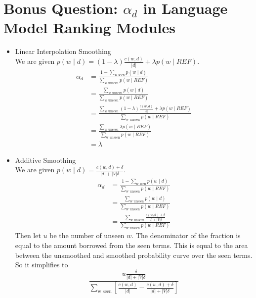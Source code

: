 \documentclass[paper=a4, fontsize=11pt]{jhwhw} %
\begin{document}
\section*{Bonus Question: $\alpha_d$ in Language Model Ranking Modules}
\solution
\begin{itemize}
    \item Linear Interpolation Smoothing\\
        We are given $p(w\mid d) = (1-\lambda)\frac{c(w,d)}{\lvert d\rvert} + \lambda p(w\mid REF)$.
        \begin{align*}
            \alpha_d &= \frac{1 - \sum_{\text{w seen}} p(w\mid d)}{\sum_{\text{w unseen}} p(w\mid REF)}\\
                     &= \frac{\sum_{\text{w unseen}} p(w\mid d)}{\sum_{\text{w unseen}} p(w\mid REF)}\\
                     &= \frac{\sum_{\text{w unseen}} (1-\lambda)\frac{c(w,d)}{\lvert d\rvert} + \lambda p(w\mid REF)}{\sum_{\text{w unseen}} p(w\mid REF)}\\
                     &= \frac{\sum_{\text{w unseen}} \lambda p(w\mid REF)}{\sum_{\text{w unseen}} p(w\mid REF)}\\
                     &= \lambda
        \end{align*}
    \item Additive Smoothing\\
        We are given $p(w\mid d) = \frac{c(w,d) + \delta}{\lvert d\rvert + \lvert V\rvert \delta}$.
        \begin{align*}
            \alpha_d &= \frac{1 - \sum_{\text{w seen}} p(w\mid d)}{\sum_{\text{w unseen}} p(w\mid REF)}\\
                     &= \frac{\sum_{\text{w unseen}} p(w\mid d)}{\sum_{\text{w unseen}} p(w\mid REF)}\\
                     &= \frac{\sum_{\text{w unseen}} \frac{c(w,d) + \delta}{\lvert d\rvert + \lvert V\rvert \delta}}{\sum_{\text{w unseen}} p(w\mid REF)}
        \end{align*}
        Then let $u$ be the number of unseen $w$. The denominator of the fraction is equal to the amount borrowed from the seen terms. This is equal to the area between the unsmoothed and smoothed probability curve over the seen terms. So it simplifies to
        $$\frac{u\frac{\delta}{\lvert d\rvert + \lvert V\rvert \delta}}{\sum_{\text{w seen}}\left [\frac{c(w, d)}{\lvert d\rvert} - \frac{c(w, d) + \delta}{\lvert d\rvert + \lvert V\rvert \delta}\right ]}$$
\end{itemize}
\end{document}
